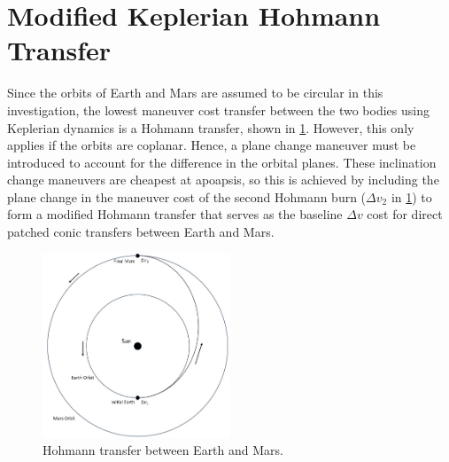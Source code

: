 \section{Modified Keplerian Hohmann Transfer}
Since the orbits of Earth and Mars are assumed to be circular in this investigation, the lowest
maneuver cost transfer between the two bodies using Keplerian dynamics is a Hohmann transfer, shown
in \cref{fig:Hohmann}. However, this only applies if the orbits are coplanar. Hence, a plane change
maneuver must be introduced to account for the difference in the orbital planes. These inclination
change maneuvers are cheapest at apoapsis, so this is achieved by including the plane change in the
maneuver cost of the second Hohmann burn ($\Delta v_{2}$ in \cref{fig:Hohmann}) to form a modified
Hohmann transfer that serves as the baseline $\Delta v$ cost for direct patched conic transfers
between Earth and Mars.

\begin{figure}[ht]
    \centering
    \includegraphics[width=0.5\textwidth]{figures/Hohmann.jpg}
    \caption{Hohmann transfer between Earth and Mars.}
    \label{fig:Hohmann}
\end{figure}

